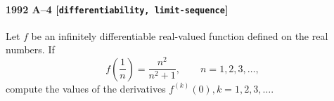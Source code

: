 \paragraph{1992 A--4 \textnormal{[\texttt{differentiability, limit-sequence}]}}
Let $f$ be an infinitely differentiable real-valued function
defined on the real numbers. If
\[
f\left( \frac{1}{n} \right) = \frac{n^2}{n^2 + 1}, \qquad n = 1, 2, 3, \dots,
\]
compute the values of the derivatives $f^{(k)}(0), k = 1, 2, 3, \dots$.
